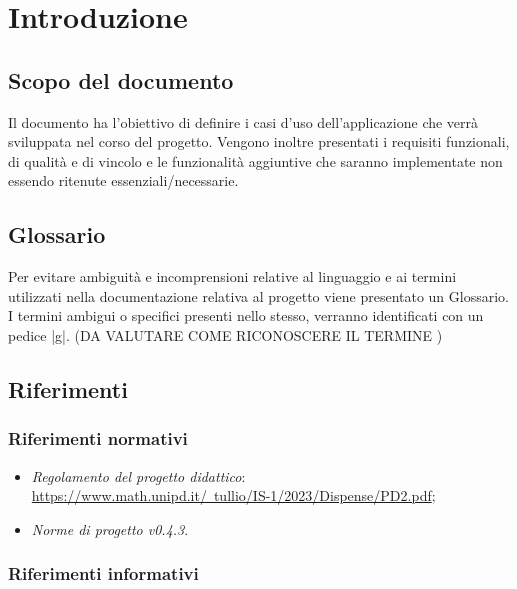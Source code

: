 \documentclass[10pt, a4paper]{article}
\title{\titolo}
\author{SWEetCode}
\begin{document}



\newpage

\tableofcontents
\newpage

\section{Introduzione}
\subsection{Scopo del documento}
Il documento ha l'obiettivo di definire i casi d'uso dell'applicazione che verrà sviluppata nel corso del progetto. Vengono inoltre presentati i requisiti funzionali, di qualità e di vincolo e le funzionalità aggiuntive che saranno implementate non essendo ritenute essenziali/necessarie.
\\
\subsection{Glossario}
Per evitare ambiguità e incomprensioni relative al linguaggio e ai termini utilizzati nella documentazione relativa al progetto viene presentato un Glossario. I termini ambigui o specifici presenti nello stesso, verranno identificati con un pedice |g|. (DA VALUTARE COME RICONOSCERE IL TERMINE )
\\
\subsection{Riferimenti}
   \subsubsection{Riferimenti normativi}
   \begin{itemize}
    \item \textit{Regolamento del progetto didattico}: \\
    \href{https://www.math.unipd.it/~tullio/IS-1/2023/Dispense/PD2.pdf}{https://www.math.unipd.it/~tullio/IS-1/2023/Dispense/PD2.pdf};
    \item \textit{Norme di progetto v0.4.3}.
    \end{itemize}
    
    \subsubsection{Riferimenti informativi}
    
\end{document}
